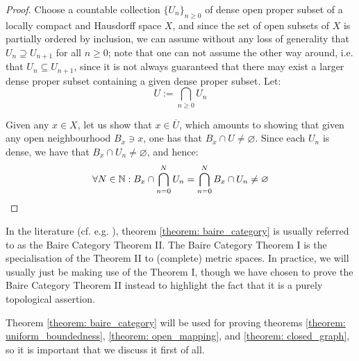             \begin{proof}
                Choose a countable collection $\{U_n\}_{n \geq 0}$ of dense open proper subset of a locally compact and Hausdorff space $X$, and since the set of open subsets of $X$ is partially ordered by inclusion, we can assume without any loss of generality that $U_n \supseteq U_{n + 1}$ for all $n \geq 0$; note that one can not assume the other way around, i.e. that $U_n \subseteq U_{n + 1}$, since it is not always guaranteed that there may exist a larger dense proper subset containing a given dense proper subset. Let:
                    $$U := \bigcap_{n \geq 0} U_n$$

                Given any $x \in X$, let us show that $x \in \overline{U}$, which amounts to showing that given any open neighbourhood $B_x \ni x$, one has that $B_x \cap U \not = \varnothing$. Since each $U_n$ is dense, we have that $B_x \cap U_n \not = \varnothing$, and hence:
                    $$\forall N \in \mathbb{N}: B_x \cap \bigcap_{n = 0}^N U_n = \bigcap_{n = 0}^N B_x \cap U_n \not = \varnothing$$
            \end{proof}
        \begin{remark}
            In the literature (cf. e.g. \cite[Theorem 2.2.2]{litvak_functional_analysis_notes}), theorem \ref{theorem: baire_category} is usually referred to as the Baire Category Theorem II. The Baire Category Theorem I is the specialisation of the Theorem II to (complete) metric spaces. In practice, we will usually just be making use of the Theorem I, though we have chosen to prove the Baire Category Theorem II instead to highlight the fact that it is a purely topological assertion.
        \end{remark}
        \begin{remark}
            Theorem \ref{theorem: baire_category} will be used for proving theorems \ref{theorem: uniform_boundedness}, \ref{theorem: open_mapping}, and \ref{theorem: closed_graph}, so it is important that we discuss it first of all.
        \end{remark}


